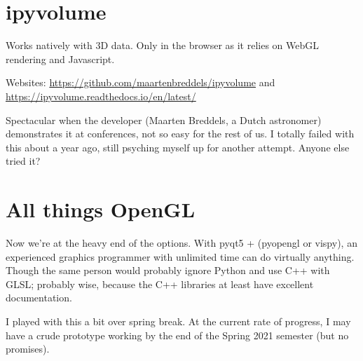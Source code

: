 \section{ipyvolume}

Works natively with 3D data. Only in the browser as it relies on WebGL rendering and Javascript.

Websites: \url{https://github.com/maartenbreddels/ipyvolume} and  \url{https://ipyvolume.readthedocs.io/en/latest/}

Spectacular when the developer (Maarten Breddels, a Dutch astronomer) demonstrates it at conferences, not so easy for the rest of us. I totally failed with this about a year ago, still psyching myself up for another attempt. Anyone else tried it?

\section{All things OpenGL}

Now we're at the heavy end of the options. With pyqt5 + (pyopengl or vispy), an experienced graphics programmer with unlimited time can do virtually anything. Though the same person would probably ignore Python and use C++ with GLSL; probably wise, because the C++ libraries at least have excellent documentation.

I played with this a bit over spring break. At the current rate of progress, I may have a crude prototype working by the end of the Spring 2021 semester (but no promises).



